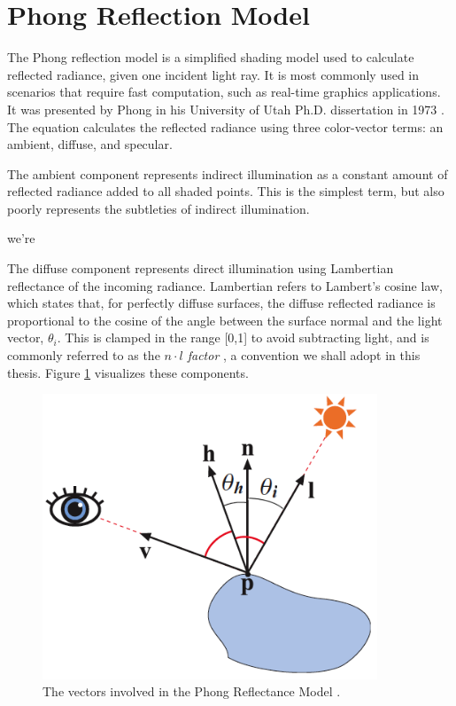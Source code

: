 \section{Phong Reflection Model}
\label{sec:phong_model}

The Phong reflection model is a simplified shading model used to calculate reflected radiance, given one incident light ray. It is most commonly used in scenarios that require fast computation, such as real-time graphics applications. It was presented by Phong in his University of Utah Ph.D. dissertation in 1973 \cite{bib:phong_thesis}. The equation calculates the reflected radiance using three color-vector terms: an ambient, diffuse, and specular.

The ambient component represents indirect illumination as a constant amount of reflected radiance added to all shaded points. This is the simplest term, but also poorly represents the subtleties of indirect illumination.

we're

The diffuse component represents direct illumination using Lambertian reflectance of the incoming radiance. Lambertian refers to Lambert's cosine law, which states that, for perfectly diffuse surfaces, the diffuse reflected radiance is proportional to the cosine of the angle between the surface normal and the light vector, $\theta_{i}$. This is clamped in the range [0,1] to avoid subtracting light, and is commonly referred to as the \textit{$n \cdot l$ factor} \cite{bib:rtr}, a convention we shall adopt in this thesis. Figure \ref{fig:phong} visualizes these components.

\begin{figure}
   \centering
   \includegraphics[width=100mm]{../img/RTR3_05_13_phong.png}
   \captionfonts
   \caption[Phong Shading Vectors]{The vectors involved in the Phong Reflectance Model \cite{bib:rtr}.}
   \label{fig:phong}
\end{figure}


